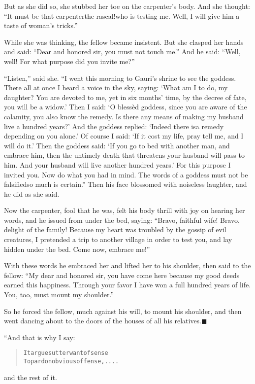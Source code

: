 \documentclass[article, twoside, 14pt]{memoir}
\newcommand{\qed}{\hfill \ensuremath{\blacksquare}}
\renewenvironment{verbatim}{%
\begin{quote}%
\vskip -10pt%
\begin{alltt}\normalfont\large}{\end{alltt}%
\end{quote}%
\vskip -10pt
} %
\begin{document}
But as she did so, she stubbed her toe on the carpenter's body. And
she thought:
``It must be that carpenter{\textemdash}the rascal!{\textemdash}who is testing me. Well, I will give him a taste of woman's tricks.''

While she was thinking, the fellow became insistent. But she
clasped her hands and said:
``Dear and honored sir, you must not touch me.'' And he said:
``Well, well! For what purpose did you invite me?''

``Listen,'' said she.
``I went this morning to Gauri's shrine to see the goddess. There all at once I heard a voice in the sky, saying: `What am I to do, my daughter? You are devoted to me, yet in six months' time, by the decree of fate, you will be a widow.' Then I said: `O blessèd goddess, since you are aware of the calamity, you also know the remedy. Is there any means of making my husband live a hundred years?' And the goddess replied: `Indeed there is{\textemdash}a remedy depending on you alone.' Of course I said: `If it cost my life, pray tell me, and I will do it.' Then the goddess said: `If you go to bed with another man, and embrace him, then the untimely death that threatens your husband will pass to him. And your husband will live another hundred years.' For this purpose I invited you. Now do what you had in mind. The words of a goddess must not be falsified{\textemdash}so much is certain.''
Then his face blossomed with noiseless laughter, and he did
as she said.

Now the carpenter, fool that he was, felt his body thrill with joy
on hearing her words, and he issued from under the bed, saying:
``Bravo, faithful wife! Bravo, delight of the family! Because my heart was troubled by the gossip of evil creatures, I pretended a trip to another village in order to test you, and lay hidden under the bed. Come now, embrace me!''

With these words he embraced her and lifted her to his shoulder,
then said to the fellow:
``My dear and honored sir, you have come here because my good deeds earned this happiness. Through your favor I have won a full hundred years of life. You, too, must mount my shoulder.''

So he forced the fellow, much against his will, to mount his
shoulder, and then went dancing about to the doors of the houses of
all his relatives.\hyperref[s59]{\qed}

“And that is why I say:

\begin{verbatim}
It argues utter want of sense
To pardon obvious offense, . . . .
\end{verbatim}
and the rest of it.
\end{document}

